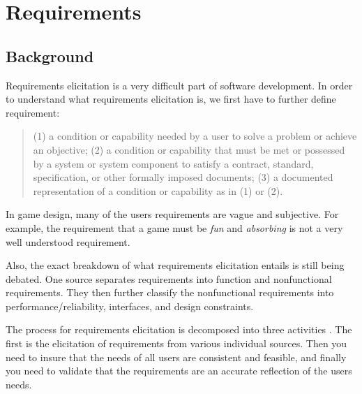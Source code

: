 \section{Requirements}
\subsection{Background}
Requirements elicitation is a very difficult part of software development. In order to understand what requirements elicitation is, we first have to further define requirement\cite[p. 62]{september1990ieee}:
\begin{quote}
	(1) a condition or capability needed by a user to solve a problem or achieve an objective; (2) a condition or capability that must be met or possessed by a system or system component to satisfy a contract, standard, specification, or other formally imposed documents; (3) a documented representation of a condition or capability as in (1) or (2).
\end{quote}
In game design, many of the users requirements are vague and subjective. For example, the requirement that a game must be \emph{fun} and \emph{absorbing} is not a very well understood requirement. 

Also, the exact breakdown of what requirements elicitation entails is still being debated. One source separates requirements into function and nonfunctional requirements\cite{southwell1987requirements}. They then further classify the nonfunctional requirements into performance/reliability, interfaces, and design constraints.

The process for requirements elicitation is decomposed into three activities \cite{rzepka1989requirements}. The first is the elicitation of requirements from various individual sources. Then you need to insure that the needs of all users are consistent and feasible, and finally you need to validate that the requirements are an accurate reflection of the users needs.

